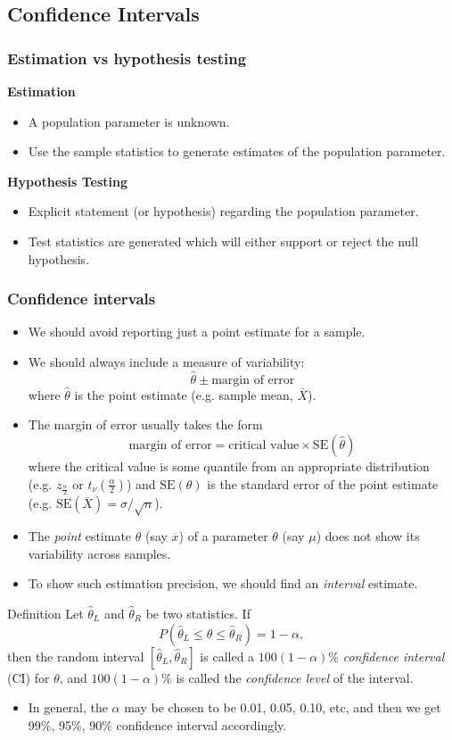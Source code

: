 \documentclass[a4paper]{article}\usepackage[]{graphicx}\usepackage[]{xcolor}
\begin{document}
\subsection{Confidence Intervals}
\subsubsection{Estimation vs hypothesis testing}
\textbf{Estimation}
\begin{itemize}
	\item A population parameter is unknown.
	\item Use the sample statistics to generate estimates of the population parameter.
\end{itemize}
\textbf{Hypothesis Testing}
\begin{itemize}
	\item Explicit statement (or hypothesis) regarding the population parameter.
	\item Test statistics are generated which will either support or reject the null hypothesis.
\end{itemize}
\subsubsection{Confidence intervals}
\begin{itemize}
	\item We should avoid reporting just a point estimate for a sample.
	\item We should always include a measure of variability:
	\[
		\hat{\theta} \pm \text{margin of error}
	\]
	where \( \hat{\theta} \) is the point estimate (e.g. sample mean, \( \overline{X} \)).
	\item The margin of error usually takes the form
	\[
		\text{margin of error} = \text{critical value} \times \mathrm{SE}(\hat{\theta})
	\]
	where the critical value is some quantile from an appropriate distribution (e.g. \( z_{\frac{\alpha}{2}} \) or \( t_\nu(\frac{\alpha}{2}) \))  and \( \mathrm{SE}(\theta) \) is the standard error of the point estimate (e.g. \( \mathrm{SE}(\overline{X}) = \sigma / \sqrt{n} \)).
	\item The \textit{point} estimate \( \hat{\theta} \) (say \( \overline{x} \)) of a parameter \( \theta \) (say \( \mu \)) does not show its variability across samples.
	\item To show such estimation precision, we should find an \textit{interval} estimate.
\end{itemize}
\begin{bluebox}{Definition}
	Let \( \hat{\theta}_L \) and \( \hat{\theta}_R \) be two statistics. If
	\[
		P(\hat{\theta}_L \leq \theta \leq \hat{\theta}_R) = 1 - \alpha,
	\]
	then the random interval \( [\hat{\theta}_L,\hat{\theta}_R] \) is called a \( 100(1-\alpha)\% \) \textit{confidence interval} (CI) for \( \theta \), and \( 100(1-\alpha)\% \) is called the \textit{confidence level} of the interval.
\end{bluebox}
\begin{itemize}
	\item In general, the \( \alpha \) may be chosen to be 0.01, 0.05, 0.10, etc, and then we get 99\%, 95\%, 90\% confidence interval accordingly.
\end{itemize}
\end{document}
